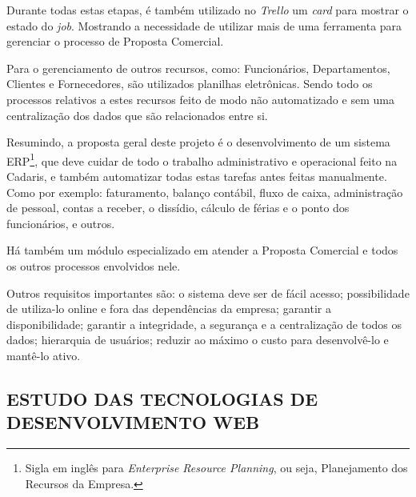 \documentclass[
  12pt,				%
  openany,
  oneside,
  a4paper,			%
  english,			%
  brazil
]{article}
\numberwithin{figure}{section}
\numberwithin{table}{section}
\begin{document}
Durante todas estas etapas, é também utilizado no \textit{Trello} um \textit{card} para mostrar o estado do \textit{job}. Mostrando a necessidade de utilizar mais de uma ferramenta para gerenciar o processo de Proposta Comercial.

Para o gerenciamento de outros recursos, como: Funcionários, Departamentos, Clientes e Fornecedores, são utilizados planilhas eletrônicas. Sendo todo os processos relativos a estes recursos feito de modo não automatizado e sem uma centralização dos dados que são relacionados entre si.

Resumindo, a proposta geral deste projeto é o desenvolvimento de um sistema ERP\footnote{Sigla em inglês para \textit{Enterprise Resource Planning}, ou seja, Planejamento dos Recursos da Empresa.}, que deve cuidar de todo o trabalho administrativo e operacional feito na Cadaris, e também automatizar todas estas tarefas antes feitas manualmente. Como por exemplo: faturamento, balanço contábil, fluxo de caixa, administração de pessoal, contas a receber, o dissídio, cálculo de férias e o ponto dos funcionários, e outros.

Há também um módulo especializado em atender a Proposta Comercial e todos os outros processos envolvidos nele.

Outros requisitos importantes são: o sistema deve ser de fácil acesso; possibilidade de utiliza-lo online e fora das dependências da empresa; garantir a disponibilidade; garantir a integridade, a segurança e a centralização de todos os dados; hierarquia de usuários; reduzir ao máximo o custo para desenvolvê-lo e mantê-lo ativo.







\subsection{ESTUDO DAS TECNOLOGIAS DE DESENVOLVIMENTO WEB}
\end{document}
